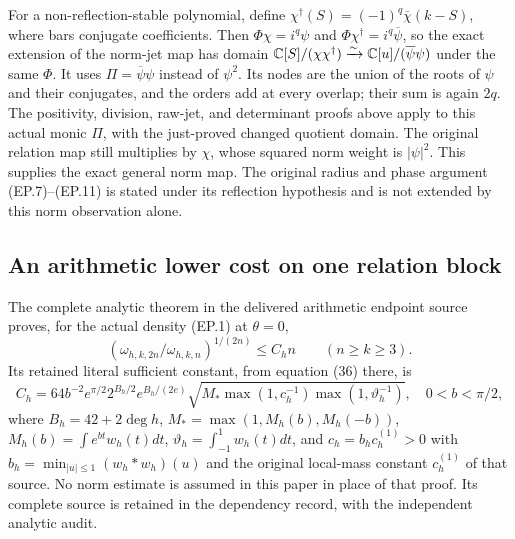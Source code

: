 For a non-reflection-stable polynomial, define
$\chi^\dagger(S)=(-1)^q\overline\chi(k-S)$, where bars conjugate
coefficients. Then $\Phi\chi=i^q\psi$ and
$\Phi\chi^\dagger=i^q\overline\psi$, so the exact extension of the
norm-jet map has domain
$\mathbb C[S]/(\chi\chi^\dagger)\xrightarrow{\sim}
\mathbb C[u]/(\overline\psi\psi)$ under the same $\Phi$.
It uses $\Pi=\overline\psi\psi$ instead of $\psi^2$. Its nodes are the
union of the roots of $\psi$ and their conjugates, and the orders
add at every overlap; their sum is again $2q$. The positivity,
division, raw-jet, and determinant proofs above apply to this actual
monic $\Pi$, with the just-proved changed quotient domain. The original
relation map still multiplies by $\chi$, whose squared norm weight
is $|\psi|^2$. This supplies the exact general norm
map. The original radius and phase argument (EP.7)--(EP.11) is
stated under its reflection hypothesis and is not extended by this
norm observation alone.

\subsection{An arithmetic lower cost on one relation block}
The complete analytic theorem in the delivered arithmetic endpoint
source proves, for the actual density (EP.1) at $\theta=0$,
\[
 \left(\omega_{h,k,2n}/\omega_{h,k,n}\right)^{1/(2n)}
 \le C_h n\qquad(n\ge k\ge3).\tag{EP.39}
\]
Its retained literal sufficient constant, from equation (36) there, is
\[
 C_h=64b^{-2}e^{\pi/2}2^{B_h/2}e^{B_h/(2e)}
 \sqrt{M_*\max(1,c_h^{-1})\max(1,\vartheta_h^{-1})},
 \quad 0<b<\pi/2,\tag{EP.40}
\]
where $B_h=42+2\deg h$, $M_*=\max(1,M_h(b),M_h(-b))$,
$M_h(b)=\int e^{bt}w_h(t)dt$,
$\vartheta_h=\int_{-1}^1w_h(t)dt$, and
$c_h=b_hc_h^{(1)}>0$ with
$b_h=\min_{|u|\le1}(w_h*w_h)(u)$ and the original local-mass
constant $c_h^{(1)}$ of that source. No norm estimate is assumed
in this paper in place of that proof. Its complete source is retained
in the dependency record, with the independent analytic audit.

